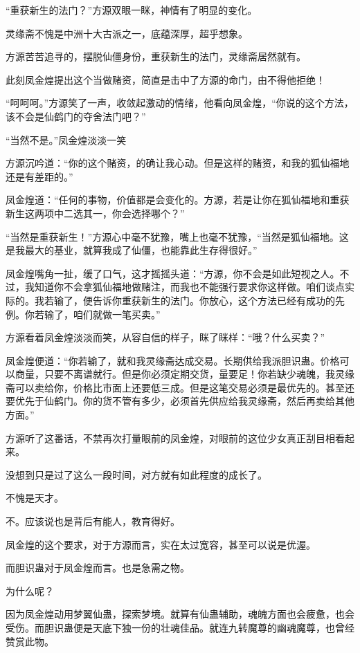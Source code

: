 
\begin{this_body}

“重获新生的法门？”方源双眼一眯，神情有了明显的变化。

灵缘斋不愧是中洲十大古派之一，底蕴深厚，超乎想象。

方源苦苦追寻的，摆脱仙僵身份，重获新生的法门，灵缘斋居然就有。

此刻凤金煌提出这个当做赌资，简直是击中了方源的命门，由不得他拒绝！

“呵呵呵。”方源笑了一声，收敛起激动的情绪，他看向凤金煌，“你说的这个方法，该不会是仙鹤门的夺舍法门吧？”

“当然不是。”凤金煌淡淡一笑

方源沉吟道：“你的这个赌资，的确让我心动。但是这样的赌资，和我的狐仙福地还是有差距的。”

凤金煌道：“任何的事物，价值都是会变化的。方源，若是让你在狐仙福地和重获新生这两项中二选其一，你会选择哪个？”

“当然是重获新生！”方源心中毫不犹豫，嘴上也毫不犹豫，“当然是狐仙福地。这是我最大的基业，就算我成了仙僵，也能靠此生存得很好。”

凤金煌嘴角一扯，缓了口气，这才摇摇头道：“方源，你不会是如此短视之人。不过，我知道你不会拿狐仙福地做赌注，而我也不能强行要求你这样做。咱们谈点实际的。我若输了，便告诉你重获新生的法门。你放心，这个方法已经有成功的先例。你若输了，咱们就做一笔买卖。”

方源看着凤金煌淡淡而笑，从容自信的样子，眯了眯样：“哦？什么买卖？”

凤金煌便道：“你若输了，就和我灵缘斋达成交易。长期供给我派胆识蛊。价格可以商量，只要不离谱就行。但是你必须定期交货，量要足！你若缺少魂魄，我灵缘斋可以卖给你，价格比市面上还要低三成。但是这笔交易必须是最优先的。甚至还要优先于仙鹤门。你的货不管有多少，必须首先供应给我灵缘斋，然后再卖给其他方面。”

方源听了这番话，不禁再次打量眼前的凤金煌，对眼前的这位少女真正刮目相看起来。

没想到只是过了这么一段时间，对方就有如此程度的成长了。

不愧是天才。

不。应该说也是背后有能人，教育得好。

凤金煌的这个要求，对于方源而言，实在太过宽容，甚至可以说是优渥。

而胆识蛊对于凤金煌而言。也是急需之物。

为什么呢？

因为凤金煌动用梦翼仙蛊，探索梦境。就算有仙蛊辅助，魂魄方面也会疲惫，也会受伤。而胆识蛊便是天底下独一份的壮魂佳品。就连九转魔尊的幽魂魔尊，也曾经赞赏此物。


\end{this_body}
